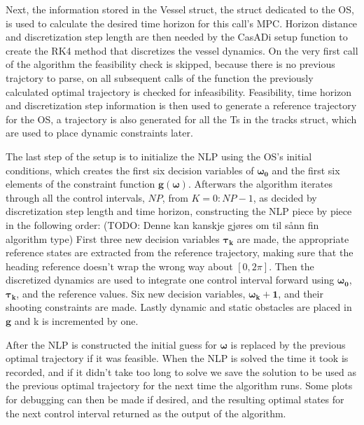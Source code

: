 Next, the information stored in the Vessel struct, the struct dedicated to the \gls{OS}, is used to calculate the desired time horizon for this call's
\gls{MPC}. Horizon distance and discretization step length are then needed by the CasADi setup function to create the \gls{RK4} method that
discretizes the vessel dynamics. On the very first call of the algorithm the feasibility check is skipped, because there is no previous trajctory to parse,
on all subsequent calls of the function the previously calculated optimal trajectory is checked for infeasibility. 
Feasibility, time horizon and discretization step information is then used to generate a reference trajectory for the \gls{OS}, a trajectory is
also generated for all the \gls{Ts} in the tracks struct, which are used to place dynamic constraints later.

The last step of the setup is to initialize the NLP using the \gls{OS}'s initial conditions, which creates the first
six decision variables of $\bm{\omega_0}$ and the first six elements of the constraint function $\textbf{g}(\bm{\omega})$.
Afterwars the algorithm iterates through all the control intervals, $NP$, from $K = 0:NP-1$, as decided by discretization step length and time horizon, 
constructing the NLP piece by piece in the following order:\newline
(TODO: Denne kan kanskje gjøres om til sånn fin algorithm type)\newline 
First three new decision variables $\bm{\tau_k}$ are made, the appropriate reference states are extracted from the reference trajectory, making sure
that the heading reference doesn't wrap the wrong way about $[0, 2\pi]$. Then the discretized dynamics are used to integrate one control interval
forward using $\bm{\omega_0}$, $\bm{\tau_k}$, and the reference values. Six new decision variables, $\bm{\omega_k+1}$, and their shooting
constraints are made. Lastly dynamic and static obstacles are placed in $\textbf{g}$ and k is incremented by one.

After the \gls{NLP} is constructed the initial guess for $\bm{\omega}$ is replaced by the previous optimal trajectory if it was feasible.
When the \gls{NLP} is solved the time it took is recorded, and if it didn't take too long to solve we save the solution to be used as the previous
optimal trajectory for the next time the algorithm runs. Some plots for debugging can then be made if desired, and the resulting optimal states
for the next control interval returned as the output of the algorithm.


